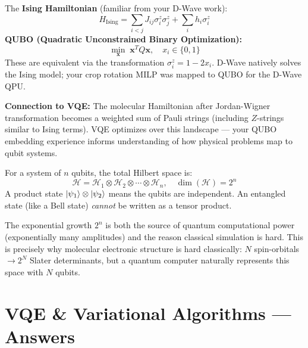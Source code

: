 \documentclass[11pt,a4paper]{article}
\begin{document}
\begin{answerbox}
The \textbf{Ising Hamiltonian} (familiar from your D-Wave work):
\[
H_{\text{Ising}} = \sum_{i<j} J_{ij} \sigma_i^z \sigma_j^z + \sum_i h_i \sigma_i^z
\]
\textbf{QUBO (Quadratic Unconstrained Binary Optimization):}
\[
\min_{\mathbf{x}} \; \mathbf{x}^T Q \mathbf{x}, \quad x_i \in \{0, 1\}
\]
These are equivalent via the transformation $\sigma_i^z = 1 - 2x_i$. D-Wave natively solves the Ising model; your crop rotation MILP was mapped to QUBO for the D-Wave QPU.

\textbf{Connection to VQE:} The molecular Hamiltonian after Jordan-Wigner transformation becomes a weighted sum of Pauli strings (including $Z$-strings similar to Ising terms). VQE optimizes over this landscape --- your QUBO embedding experience informs understanding of how physical problems map to qubit systems.
\end{answerbox}

\begin{answerbox}
For a system of $n$ qubits, the total Hilbert space is:
\[
\mathcal{H} = \mathcal{H}_1 \otimes \mathcal{H}_2 \otimes \cdots \otimes \mathcal{H}_n, \quad \dim(\mathcal{H}) = 2^n
\]
A product state $\ket{\psi_1} \otimes \ket{\psi_2}$ means the qubits are independent. An entangled state (like a Bell state) \emph{cannot} be written as a tensor product.

The exponential growth $2^n$ is both the source of quantum computational power (exponentially many amplitudes) and the reason classical simulation is hard. This is precisely why molecular electronic structure is hard classically: $N$ spin-orbitals $\to 2^N$ Slater determinants, but a quantum computer naturally represents this space with $N$ qubits.
\end{answerbox}


\section{VQE \& Variational Algorithms --- Answers}
\end{document}
